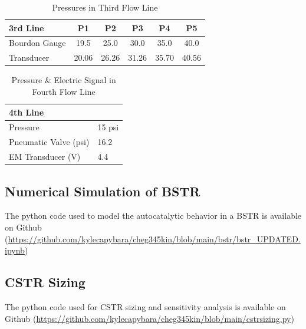 \begin{table}[H]
    \centering
    \caption{Pressures in Third Flow Line}
    \label{tab:thirdflowline}
    \begin{tabular}{lccccc}
        \toprule
        3rd Line & P1 & P2 & P3 & P4 & P5 \\
        \midrule
        Bourdon Gauge & 19.5 & 25.0 & 30.0 & 35.0 & 40.0 \\
        Transducer    & 20.06 & 26.26 & 31.26 & 35.70 & 40.56 \\
        \bottomrule
    \end{tabular}
\end{table}

\begin{table}[H]
    \centering
    \caption{Pressure \& Electric Signal in Fourth Flow Line}
    \label{tab:fourthflowline}
    \begin{tabular}{ll}
        \toprule
        4th Line                &  \\ \midrule
        Pressure & 15 psi \\
        Pneumatic Valve (psi)   & 16.2 \\
        EM Transducer (V)       & 4.4 \\
        \bottomrule
    \end{tabular}
\end{table}



\subsection{Numerical Simulation of BSTR}
\label{app:bstr}

The python code used to model the autocatalytic behavior in a BSTR is available on Github (\url{https://github.com/kylecapybara/cheg345kin/blob/main/bstr/bstr_UPDATED.ipynb})

\subsection{CSTR Sizing}

The python code used for CSTR sizing and sensitivity analysis is available on Github (\url{https://github.com/kylecapybara/cheg345kin/blob/main/cstrsizing.py})


